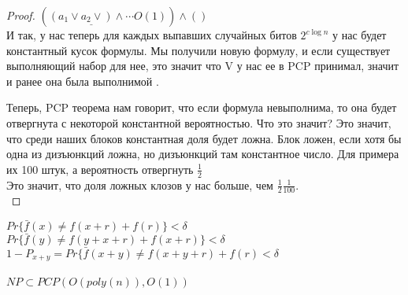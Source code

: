 \begin{proof}
	$(\underline{(a_1 \vee a_2 \vee )\wedge \cdots}{O(1)})\wedge()$\\

	И так, у нас теперь для каждых выпавших случайных битов $2^{c\log n}$ у нас будет константный кусок формулы.
	Мы получили новую формулу, и если существует выполняющий набор для нее, это значит что V у нас ее в PCP принимал,
	значит и ранее она была выполнимой .

        Теперь, PCP теорема нам говорит, что если формула невыполнима, то она будет отвергнута с некоторой константной
        вероятностью. Что это значит? Это значит, что среди наших блоков константная доля будет ложна. Блок ложен, 
        если хотя бы одна из дизъюнкций ложна, но дизъюнкций там константное число. Для примера их 100 штук, а вероятность отвергнуть 
        $\frac{1}{2}$\\
        Это значит, что доля ложных клозов у нас больше, чем $\frac{1}{2}\frac{1}{100}$.\\
\end{proof}                                                                     


$Pr\{\bar{f}(x) \ne f(x + r) + f(r)\} < \delta$\\
$Pr\{\bar{f}(y) \ne f(y + x + r) + f(x + r)\} < \delta$\\
$1 - P_{x + y} = Pr\{\bar{f}(x + y) \ne f(x + y + r) + f(r) < \delta$\\
\\
$NP \subset PCP(O(poly(n)), O(1))$\\